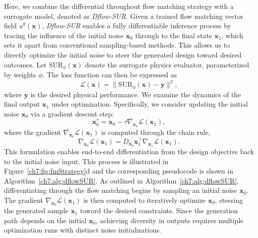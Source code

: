 Here, we combine the differential throughout flow matching strategy with a surrogate model, denoted as \textit{Dflow-SUR}. Given a trained flow matching vector field $u^{\theta}(\mathbf{x})$, \textit{Dflow-SUR} enables a fully differentiable inference process by tracing the influence of the initial noise $\mathbf{x}_0$ through to the final state $\mathbf{x}_1$, which sets it apart from conventional sampling-based methods. This allows us to directly optimize the initial noise to steer the generated design toward desired outcomes. Let \(\mathrm{SUR}_{\phi}(\mathbf{x})\) denote the surrogate physics evaluator, parameterized by weights \(\phi\). The loss function can then be expressed as
\begin{equation}
    \mathcal{L}(\mathbf{x})=\|\mathrm{SUR}_{\phi}(\mathbf{x})-\mathbf{y}\|^2,
\end{equation}
where $\mathbf{y}$ is the desired physical performance. We examine the dynamics of the final output $\mathbf{x}_1$ under optimization. Specifically, we consider updating the initial noise $\mathbf{x}_0$ via a gradient descent step:
\begin{equation}
    \mathbf{x}_0^\tau = \mathbf{x}_0 - \tau \nabla_{\mathbf{x}_0} \mathcal{L}(\mathbf{x}_1),
\end{equation}
where the gradient \(\nabla_{\mathbf{x}_0} \mathcal{L}(\mathbf{x}_1)\) is computed through the chain rule,
\begin{equation}
    \nabla_{\mathbf{x}_0} \mathcal{L}(\mathbf{x}_1) = D_{\mathbf{x}_0} \mathbf{x}_1^\top \nabla_{\mathbf{x}_1} \mathcal{L}(\mathbf{x}_1).
\end{equation}
This formulation enables end-to-end differentiation from the design objective back to the initial noise input. This process is illustrated in Figure~\ref{ch7:fig:fmStrategy}d and the corresponding pseudocode is shown in Algorithm~\ref{ch7:alg:dflowSUR}. As outlined in Algorithm~\ref{ch7:alg:dflowSUR}, differentiating through the flow matching begins by sampling an initial noise $\mathbf{x}_0$. The gradient $\nabla_{\mathbf{x}_0} \mathcal{L}(\mathbf{x}_1)$ is then computed to iteratively optimize $\mathbf{x}_0$, steering the generated sample $\mathbf{x}_1$ toward the desired constraints. Since the generation path depends on the initial $\mathbf{x}_0$, achieving diversity in outputs requires multiple optimization runs with distinct noise initializations.

